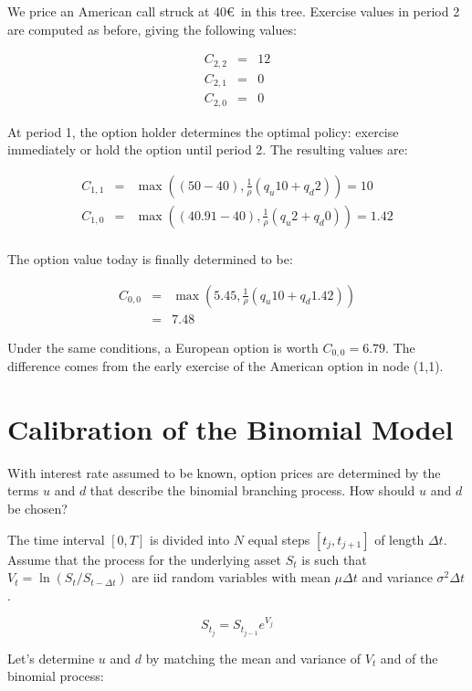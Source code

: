 \documentclass[justified]{tufte-book}
\begin{document}
We price an American call struck at 40€~in this tree. Exercise values in
period 2 are computed as before, giving the following values:

\[\begin{aligned}
C_{2,2} &=& 12 \\
C_{2,1} &=& 0 \\
C_{2,0} &=& 0 \end{aligned}\]

At period 1, the option holder determines the optimal policy: exercise
immediately or hold the option until period 2. The resulting values are:

\[\begin{aligned}
C_{1,1} &=& \max((50-40), \frac{1}{\rho} (q_u 10 + q_d 2)) = 10 \\
C_{1,0} &=& \max((40.91-40), \frac{1}{\rho} (q_u 2 + q_d 0)) = 1.42 \\\end{aligned}\]

The option value today is finally determined to be:

\[\begin{aligned}
C_{0,0} &=& \max(5.45, \frac{1}{\rho} (q_u 10  + q_d 1.42)) \\
&=& 7.48\end{aligned}\]

Under the same conditions, a European option is worth \(C_{0,0} = 6.79\).
The difference comes from the early exercise of the American option in
node (1,1).

\hypertarget{calibration-of-the-binomial-model}{%
\section{Calibration of the Binomial Model}\label{calibration-of-the-binomial-model}}

With interest rate assumed to be known, option prices are determined by
the terms \(u\) and \(d\) that describe the binomial branching process. How
should \(u\) and \(d\) be chosen?

The time interval \([0, T]\) is divided into \(N\) equal steps
\([t_j , t_{j+1}]\) of length \(\Delta t\). Assume that the process for the
underlying asset \(S_t\) is such that \(V_t = \ln(S_t/S_{t-\Delta t})\) are
iid random variables with mean \(\mu \Delta t\) and variance
\(\sigma^2 \Delta t\).

\[S_{t_j} = S_{t_{j-1}} e^{V_j}\]

Let's determine \(u\) and \(d\) by matching the mean and variance of \(V_t\)
and of the binomial process:
\end{document}
